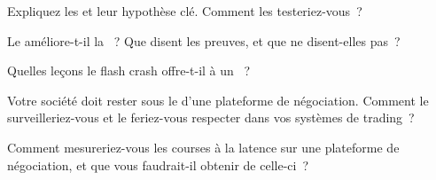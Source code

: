 \begin{interviewq}\label{iq:mx:market-quality-and-regulation:2}
Expliquez les  et leur hypothèse clé. Comment les testeriez-vous~?
\end{interviewq}

\begin{interviewq}\label{iq:mx:market-quality-and-regulation:3}
Le  améliore-t-il la ~? Que disent les preuves, et que ne disent-elles pas~?
\end{interviewq}

\begin{interviewq}\label{iq:mx:market-quality-and-regulation:4}
Quelles leçons le flash crash offre-t-il à un ~?
\end{interviewq}

\begin{interviewq}\label{iq:mx:market-quality-and-regulation:5}
Votre société doit rester sous le  d'une plateforme de négociation. Comment le surveilleriez-vous et le feriez-vous respecter dans vos systèmes de trading~?
\end{interviewq}

\begin{interviewq}\label{iq:mx:market-quality-and-regulation:6}
Comment mesureriez-vous les courses à la latence sur une plateforme de négociation, et que vous faudrait-il obtenir de celle-ci~?
\end{interviewq}
